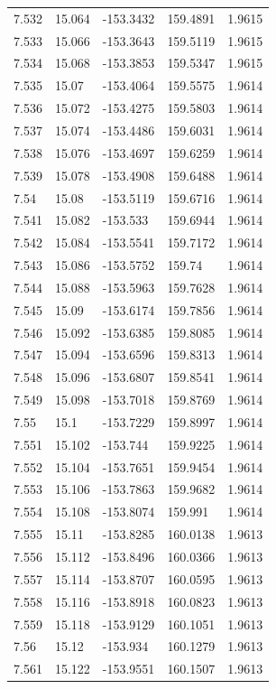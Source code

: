\begin{tabular}{lllll}
7.532 & 15.064 & -153.3432 & 159.4891 & 1.9615 \\
7.533 & 15.066 & -153.3643 & 159.5119 & 1.9615 \\
7.534 & 15.068 & -153.3853 & 159.5347 & 1.9615 \\
7.535 & 15.07 & -153.4064 & 159.5575 & 1.9614 \\
7.536 & 15.072 & -153.4275 & 159.5803 & 1.9614 \\
7.537 & 15.074 & -153.4486 & 159.6031 & 1.9614 \\
7.538 & 15.076 & -153.4697 & 159.6259 & 1.9614 \\
7.539 & 15.078 & -153.4908 & 159.6488 & 1.9614 \\
7.54 & 15.08 & -153.5119 & 159.6716 & 1.9614 \\
7.541 & 15.082 & -153.533 & 159.6944 & 1.9614 \\
7.542 & 15.084 & -153.5541 & 159.7172 & 1.9614 \\
7.543 & 15.086 & -153.5752 & 159.74 & 1.9614 \\
7.544 & 15.088 & -153.5963 & 159.7628 & 1.9614 \\
7.545 & 15.09 & -153.6174 & 159.7856 & 1.9614 \\
7.546 & 15.092 & -153.6385 & 159.8085 & 1.9614 \\
7.547 & 15.094 & -153.6596 & 159.8313 & 1.9614 \\
7.548 & 15.096 & -153.6807 & 159.8541 & 1.9614 \\
7.549 & 15.098 & -153.7018 & 159.8769 & 1.9614 \\
7.55 & 15.1 & -153.7229 & 159.8997 & 1.9614 \\
7.551 & 15.102 & -153.744 & 159.9225 & 1.9614 \\
7.552 & 15.104 & -153.7651 & 159.9454 & 1.9614 \\
7.553 & 15.106 & -153.7863 & 159.9682 & 1.9614 \\
7.554 & 15.108 & -153.8074 & 159.991 & 1.9614 \\
7.555 & 15.11 & -153.8285 & 160.0138 & 1.9613 \\
7.556 & 15.112 & -153.8496 & 160.0366 & 1.9613 \\
7.557 & 15.114 & -153.8707 & 160.0595 & 1.9613 \\
7.558 & 15.116 & -153.8918 & 160.0823 & 1.9613 \\
7.559 & 15.118 & -153.9129 & 160.1051 & 1.9613 \\
7.56 & 15.12 & -153.934 & 160.1279 & 1.9613 \\
7.561 & 15.122 & -153.9551 & 160.1507 & 1.9613 \\

\end{tabular}
